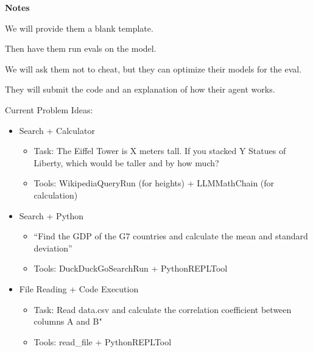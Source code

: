 {\color{red}

\textbf{Notes}

We will provide them a blank template.

Then have them run evals on the model.

We will ask them not to cheat, but
they can optimize their models for the eval.

They will submit the code and 
an explanation of how their agent works.


Current Problem Ideas:

\begin{itemize}
    \item Search + Calculator
    \begin{itemize}
        \item Task: The Eiffel Tower is X meters tall. If you stacked Y Statues of Liberty, which would be taller and by how much?
        \item Tools: WikipediaQueryRun (for heights) + LLMMathChain (for calculation)
    \end{itemize}

    \item  Search + Python
    \begin{itemize}
        \item ``Find the GDP of the G7 countries and calculate the mean and standard deviation''
        \item Tools: DuckDuckGoSearchRun + PythonREPLTool
    \end{itemize}
    
    \item File Reading + Code Execution
    \begin{itemize}
        \item Task: Read data.csv and calculate the correlation coefficient between columns A and B"
        \item Tools: read\_file + PythonREPLTool
    \end{itemize}
\end{itemize}

}